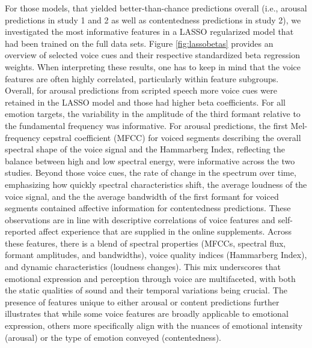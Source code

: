 \documentclass[
  english,
  man,floatsintext]{apa6}
\begin{document}
For those models, that yielded better-than-chance predictions overall (i.e., arousal predictions in study 1 and 2 as well as contentedness predictions in study 2), we investigated the most informative features in a LASSO regularized model that had been trained on the full data sets. Figure \ref{fig:lassobetas} provides an overview of selected voice cues and their respective standardized beta regression weights. When interpreting these results, one has to keep in mind that the voice features are often highly correlated, particularly within feature subgroups. Overall, for arousal predictions from scripted speech more voice cues were retained in the LASSO model and those had higher beta coefficients.
For all emotion targets, the variability in the amplitude of the third formant relative to the fundamental frequency was informative.
For arousal predictions, the first Mel-frequency cepstral coefficient (MFCC) for voiced segments describing the overall spectral shape of the voice signal and the Hammarberg Index, reflecting the balance between high and low spectral energy, were informative across the two studies.
Beyond those voice cues, the rate of change in the spectrum over time, emphasizing how quickly spectral characteristics shift, the average loudness of the voice signal, and the the average bandwidth of the first formant for voiced segments contained affective information for contentedness predictions. These observations are in line with descriptive correlations of voice features and self-reported affect experience that are supplied in the online supplements.
Across these features, there is a blend of spectral properties (MFCCs, spectral flux, formant amplitudes, and bandwidths), voice quality indices (Hammarberg Index), and dynamic characteristics (loudness changes). This mix underscores that emotional expression and perception through voice are multifaceted, with both the static qualities of sound and their temporal variations being crucial. The presence of features unique to either arousal or content predictions further illustrates that while some voice features are broadly applicable to emotional expression, others more specifically align with the nuances of emotional intensity (arousal) or the type of emotion conveyed (contentedness).
\end{document}
